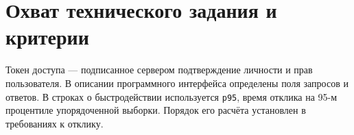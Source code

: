 \documentclass[12pt,a4paper]{article}
\begin{document}
\section{Охват технического задания и критерии}\label{4-ux43eux445ux432ux430ux442-ux442ux435ux445ux43dux438ux447ux435ux441ux43aux43eux433ux43e-ux437ux430ux434ux430ux43dux438ux44f-ux438-ux43aux440ux438ux442ux435ux440ux438ux438}

\hypertarget{4-охват-технического-задания-и-критерии}{}

Токен доступа --- подписанное сервером подтверждение личности и прав пользователя. В описании программного интерфейса определены поля запросов и ответов. В строках о быстродействии используется \texttt{p95}, время отклика на 95-м процентиле упорядоченной выборки. Порядок его расчёта установлен в требованиях к отклику.
\end{document}
